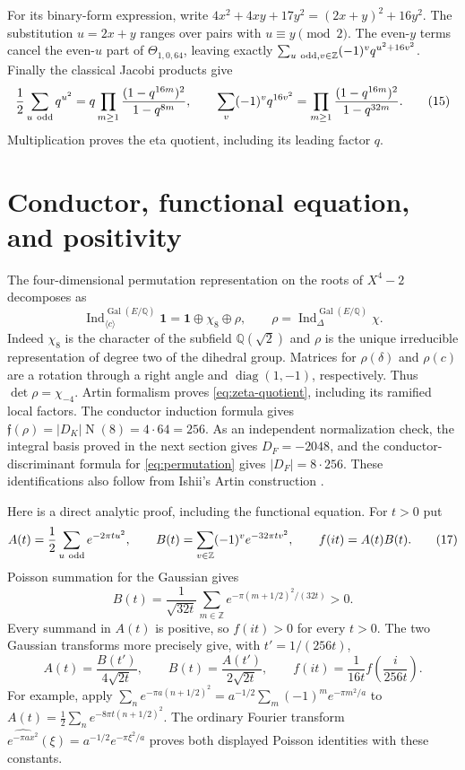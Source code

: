 \documentclass[11pt]{article}
\newcommand{\Q}{\mathbb Q}
\newcommand{\Z}{\mathbb Z}
\newcommand{\Gal}{\operatorname{Gal}}
\newcommand{\N}{\operatorname N}
\begin{document}
For its binary-form expression, write
$4x^2+4xy+17y^2=(2x+y)^2+16y^2$.
The substitution $u=2x+y$ ranges over pairs with $u\equiv y\pmod2$.
The even-$y$ terms cancel the even-$u$ part of
$\Theta_{1,0,64}$, leaving exactly
$\sum_{u\ {\rm odd},v\in\Z}(-1)^vq^{u^2+16v^2}$.
Finally the classical Jacobi products
\citep[Equations~20.5.2 and 20.5.4]{DLMF} give
\[
 \frac12\sum_{u\ {\rm odd}}q^{u^2}
 =q\prod_{m\ge1}\frac{(1-q^{16m})^2}{1-q^{8m}},\qquad
 \sum_v(-1)^vq^{16v^2}
 =\prod_{m\ge1}\frac{(1-q^{16m})^2}{1-q^{32m}}.
 \tag{15}\label{eq:jacobi-products}
\]
Multiplication proves the eta quotient, including its leading factor $q$.

\section{Conductor, functional equation, and positivity}

The four-dimensional permutation representation on the roots of
$X^4-2$ decomposes as
\[
 \operatorname{Ind}_{\langle c\rangle}^{\Gal(E/\Q)}\boldsymbol1
   =\boldsymbol1\oplus\chi_8\oplus\rho,
 \qquad \rho=\operatorname{Ind}_\Delta^{\Gal(E/\Q)}\chi.
 \tag{16}\label{eq:permutation}
\]
Indeed $\chi_8$ is the character of the subfield $\Q(\sqrt2)$ and
$\rho$ is the unique irreducible representation of degree two of the
dihedral group. Matrices for $\rho(\delta)$ and $\rho(c)$ are a rotation
through a right angle and $\operatorname{diag}(1,-1)$, respectively.
Thus $\det\rho=\chi_{-4}$. Artin formalism proves
\eqref{eq:zeta-quotient}, including its ramified local factors.
The conductor induction formula gives
$\mathfrak f(\rho)=|D_K|\N(8)=4\cdot64=256$.
As an independent normalization check, the integral basis proved in the
next section gives $D_F=-2048$, and the conductor-discriminant formula
for \eqref{eq:permutation} gives $|D_F|=8\cdot256$.
These identifications also follow from Ishii's Artin construction
\citep[\S2, pp.~119--120, and \S3, Table~3]{Ishii1985}.

Here is a direct analytic proof, including the functional equation.
For $t>0$ put
\[
 A(t)=\frac12\sum_{u\ {\rm odd}}e^{-2\pi t u^2},\qquad
 B(t)=\sum_{v\in\Z}(-1)^v e^{-32\pi t v^2},
 \qquad f(it)=A(t)B(t).
 \tag{17}\label{eq:AB}
\]
Poisson summation for the Gaussian gives
\[
 B(t)=\frac1{\sqrt{32t}}
       \sum_{m\in\Z}e^{-\pi(m+1/2)^2/(32t)}>0.
 \tag{18}\label{eq:B-positive}
\]
Every summand in $A(t)$ is positive, so $f(it)>0$ for every $t>0$.
The two Gaussian transforms more precisely give, with $t'=1/(256t)$,
\[
 A(t)=\frac{B(t')}{4\sqrt{2t}},\qquad
 B(t)=\frac{A(t')}{2\sqrt{2t}},\qquad
 f(it)=\frac1{16t}f\left(\frac{i}{256t}\right).
 \tag{19}\label{eq:theta-transform}
\]
For example, apply
$\sum_n e^{-\pi a(n+1/2)^2}
=a^{-1/2}\sum_m(-1)^m e^{-\pi m^2/a}$
to $A(t)=\frac12\sum_n e^{-8\pi t(n+1/2)^2}$.
The ordinary Fourier transform
$\widehat{e^{-\pi a x^2}}(\xi)=a^{-1/2}e^{-\pi\xi^2/a}$
proves both displayed Poisson identities with these constants.
\end{document}
